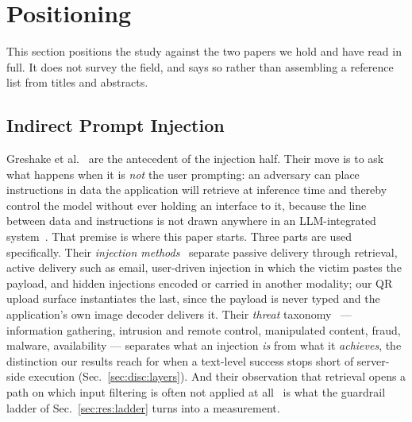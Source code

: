 %
\section{Positioning}
\label{sec:related}

This section positions the study against the two papers we hold and
have read in full. It does not survey the field, and says so rather
than assembling a reference list from titles and abstracts.

\subsection{Indirect Prompt Injection}
\label{sec:rel:injection}

Greshake et al.~\cite{greshake2023} are the antecedent of the injection
half. Their move is to ask what happens when it is \emph{not} the user
prompting: an adversary can place instructions in data the application
will retrieve at inference time and thereby control the model without
ever holding an interface to it, because the line between data and
instructions is not drawn anywhere in an LLM-integrated
system~\cite[Sec.~2]{greshake2023}. That premise is where this paper
starts. Three parts are used specifically. Their \emph{injection
methods}~\cite[Sec.~3.1]{greshake2023} separate passive delivery
through retrieval, active delivery such as email, user-driven injection
in which the victim pastes the payload, and hidden injections encoded
or carried in another modality; our QR upload surface instantiates the
last, since the payload is never typed and the application's own image
decoder delivers it. Their \emph{threat}
taxonomy~\cite[Sec.~3.2]{greshake2023} --- information gathering,
intrusion and remote control, manipulated content, fraud, malware,
availability --- separates what an injection \emph{is} from what it
\emph{achieves}, the distinction our results reach for when a
text-level success stops short of server-side execution
(Sec.~\ref{sec:disc:layers}). And their observation that retrieval
opens a path on which input filtering is often not applied at
all~\cite[Sec.~3]{greshake2023} is what the guardrail ladder of
Sec.~\ref{sec:res:ladder} turns into a measurement.

